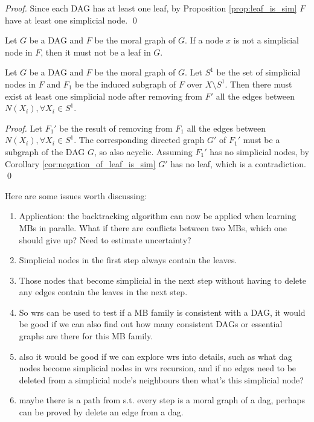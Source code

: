 \begin{proof}
Since each DAG has at least one leaf, by Proposition \ref{prop:leaf_is_sim} $F$ have at least one simplicial node. \qed
\end{proof}

\begin{corollary}
\label{cor:negation_of_leaf_is_sim}
Let $G$ be a DAG and $F$ be the moral graph of $G$. If a node $x$ is not a simplicial node in $F$, then it must not be a leaf in $G$. 
\end{corollary}

\begin{proposition}
Let $G$ be a DAG and $F$ be the moral graph of $G$. Let $S^1$ be the set of simplicial nodes in $F$ and $F_1$ be the induced subgraph of $F$ over $X\setminus S^1$. Then there must exist at least one simplicial node after removing from $F'$ all the edges between $N(X_i), \forall X_i \in S^1$.
\end{proposition}

\begin{proof}
Let $F_1'$ be the result of removing from $F_1$ all the edges between $N(X_i), \forall X_i \in S^1$. The corresponding directed graph $G'$ of $F_1'$ must be a subgraph of the DAG $G$, so also acyclic. Assuming $F_1'$ has no simplicial nodes, by Corollary \ref{cor:negation_of_leaf_is_sim} $G'$ has no leaf, which is a contradiction. \qed
\end{proof}


Here are some issues worth discussing:
\begin{enumerate}
\item Application: the backtracking algorithm can now be applied when learning MBs in paralle. What if there are conflicts between two MBs, which one should give up? Need to estimate uncertainty?
\item Simplicial nodes in the first step always contain the leaves.
\item Those nodes that become simplicial in the next step without having to delete any edges contain the leaves in the next step. 
\item So wrs can be used to test if a MB family is consistent with a DAG, it would be good if we can also find out how many consistent DAGs or essential graphs are there for this MB family. 
\item also it would be good if we can explore wrs into details, such as what dag nodes become simplicial nodes in wrs recursion, and if no edges need to be deleted from a simplicial node's neighbours then what's this simplicial node?
\item maybe there is a path from s.t. every step is a moral graph of a dag, perhaps can be proved by delete an edge from a dag.   
\end{enumerate}

